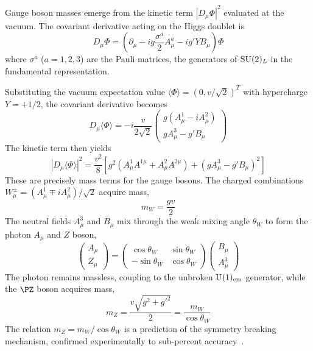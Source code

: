 Gauge boson masses emerge from the kinetic term $|D_\mu\Phi|^2$ evaluated at the vacuum. The covariant derivative acting on the Higgs doublet is
\begin{equation}
D_\mu\Phi = \left(\partial_\mu - ig\frac{\sigma^a}{2}A^a_\mu - ig'Y B_\mu\right)\Phi
\label{eq:covariant_derivative}
\end{equation}
where $\sigma^a$ ($a = 1, 2, 3$) are the Pauli matrices, the generators of $\mathrm{SU}(2)_L$ in the fundamental representation.

Substituting the vacuum expectation value $\langle\Phi\rangle = (0, v/\sqrt{2})^T$ with hypercharge $Y = +1/2$, the covariant derivative becomes
\begin{equation}
D_\mu\langle\Phi\rangle = -i\frac{v}{2\sqrt{2}}\begin{pmatrix} g(A^1_\mu - iA^2_\mu) \\ g A^3_\mu - g' B_\mu \end{pmatrix}
\end{equation}
The kinetic term then yields
\begin{equation}
|D_\mu\langle\Phi\rangle|^2 = \frac{v^2}{8}\left[g^2(A^1_\mu A^{1\mu} + A^2_\mu A^{2\mu}) + (gA^3_\mu - g'B_\mu)^2\right]
\end{equation}
These are precisely mass terms for the gauge bosons. The charged combinations $W^\pm_\mu = (A^1_\mu \mp i A^2_\mu)/\sqrt{2}$ acquire mass,
\begin{equation}
m_W = \frac{gv}{2}
\label{eq:w_mass}
\end{equation}
The neutral fields $A^3_\mu$ and $B_\mu$ mix through the weak mixing angle $\theta_W$ to form the photon $A_\mu$ and $Z$ boson,
\begin{equation}
\begin{pmatrix} A_\mu \\ Z_\mu \end{pmatrix} =
\begin{pmatrix} \cos\theta_W & \sin\theta_W \\ -\sin\theta_W & \cos\theta_W \end{pmatrix}
\begin{pmatrix} B_\mu \\ A^3_\mu \end{pmatrix}
\label{eq:neutral_mixing}
\end{equation}
The photon remains massless, coupling to the unbroken $\mathrm{U}(1)_{\text{em}}$ generator, while the $\PZ$ boson acquires mass,
\begin{equation}
m_Z = \frac{v\sqrt{g^2 + g'^2}}{2} = \frac{m_W}{\cos\theta_W}
\label{eq:z_mass}
\end{equation}
The relation $m_Z = m_W/\cos\theta_W$ is a prediction of the symmetry breaking mechanism, confirmed experimentally to sub-percent accuracy~\cite{PDG2024}.

